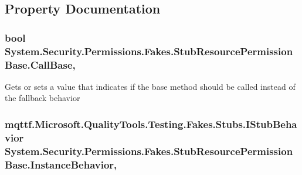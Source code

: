 \subsection{Property Documentation}
\hypertarget{class_system_1_1_security_1_1_permissions_1_1_fakes_1_1_stub_resource_permission_base_a46639122a16262f420ccc9a5cc5d9688}{
\subsubsection[{Call\-Base}]{\setlength{\rightskip}{0pt plus 5cm}bool System.\-Security.\-Permissions.\-Fakes.\-Stub\-Resource\-Permission\-Base.\-Call\-Base\hspace{0.3cm}{\ttfamily [get]}, {\ttfamily [set]}}}\label{class_system_1_1_security_1_1_permissions_1_1_fakes_1_1_stub_resource_permission_base_a46639122a16262f420ccc9a5cc5d9688}


Gets or sets a value that indicates if the base method should be called instead of the fallback behavior

\hypertarget{class_system_1_1_security_1_1_permissions_1_1_fakes_1_1_stub_resource_permission_base_a228434c68ccd38cb4e426158b642c4c0}{
\subsubsection[{Instance\-Behavior}]{\setlength{\rightskip}{0pt plus 5cm}mqttf.\-Microsoft.\-Quality\-Tools.\-Testing.\-Fakes.\-Stubs.\-I\-Stub\-Behavior System.\-Security.\-Permissions.\-Fakes.\-Stub\-Resource\-Permission\-Base.\-Instance\-Behavior\hspace{0.3cm}{\ttfamily [get]}, {\ttfamily [set]}}}\label{class_system_1_1_security_1_1_permissions_1_1_fakes_1_1_stub_resource_permission_base_a228434c68ccd38cb4e426158b642c4c0}


